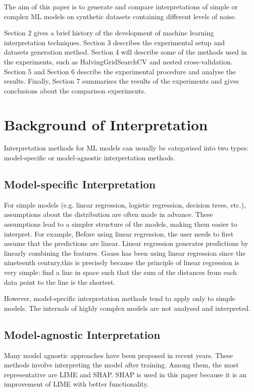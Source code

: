 \documentclass[runningheads,a4paper]{llncs}
\begin{document}
The aim of this paper is to generate and compare interpretations of simple or complex ML models on synthetic datasets containing different levels of noise.

Section 2 gives a brief history of the development of machine learning interpretation techniques. 
Section 3 describes the experimental setup and datasets generation method. 
Section 4 will describe some of the methods used in the experiments, such as HalvingGridSearchCV and nested cross-validation.
Section 5 and Section 6 describe the experimental procedure and analyse the results. 
Finally, Section 7 summarises the results of the experiments and gives conclusions about the comparison experiments.

\section{Background of Interpretation}

Interpretation methods for ML models can usually be categorised into two types: model-specific or model-agnostic interpretation methods\cite{doshivelez2017rigorous}.

\subsection{Model-specific Interpretation}

For simple models (e.g. linear regression, logistic regression, decision trees, etc.), assumptions about the distribution  are often made in advance\cite{doshivelez2017rigorous}.
These assumptions lead to a simpler structure of the models, making them easier to interpret.
For example, Before using linear regression, the user needs to first assume that the predictions are linear.
Linear regression generates predictions by linearly combining the features.
Gauss has been using linear regression since the nineteenth century\cite{gauss1877theoria},this is precisely because the principle of linear regression is very simple: find a line in space such that the sum of the distances from each data point to the line is the shortest.


However, model-specific interpretation methods tend to apply only to simple models. The internals of highly complex models are not analysed and interpreted.

\subsection{Model-agnostic Interpretation}
Many model agnostic approaches have been proposed in recent years. 
These methods involve interpreting the model after training.
Among them, the most representative are LIME and SHAP.
SHAP is used in this paper because it is an improvement of LIME with better functionality\cite{alvarezmelis2018robustness}.
\end{document}
